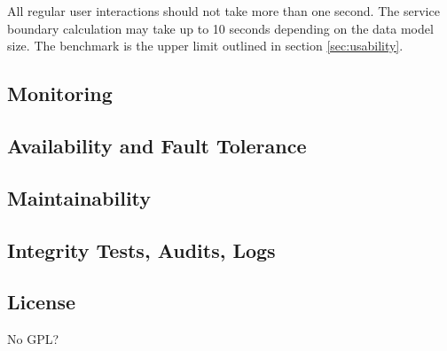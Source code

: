 All regular user interactions should not take more than one second. The service boundary calculation may take up to 10 seconds depending on the data model size. The benchmark is the upper limit outlined in section \ref{sec:usability}.

\subsection{Monitoring}

\subsection{Availability and Fault Tolerance}

\subsection{Maintainability}

\subsection{Integrity Tests, Audits, Logs}

\subsection{License}

No GPL?